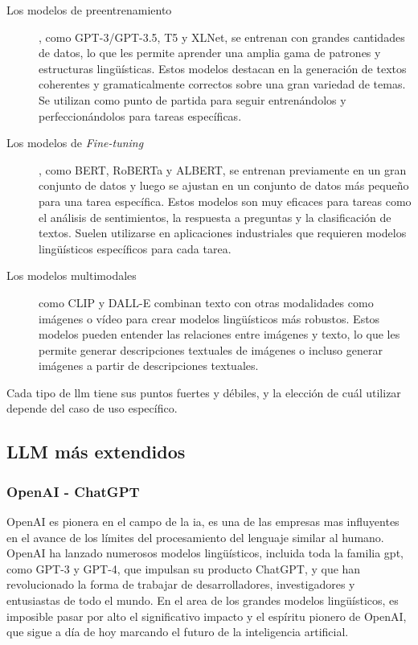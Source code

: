 \begin{description}

\item[Los modelos de preentrenamiento], como GPT-3/GPT-3.5, T5 y XLNet, se entrenan con grandes cantidades de datos, lo que les permite aprender una amplia gama de patrones y estructuras lingüísticas. Estos modelos destacan en la generación de textos coherentes y gramaticalmente correctos sobre una gran variedad de temas. Se utilizan como punto de partida para seguir entrenándolos y perfeccionándolos para tareas específicas.

\item[Los modelos de \textit{Fine-tuning}], como BERT, RoBERTa y ALBERT, se entrenan previamente en un gran conjunto de datos y luego se ajustan en un conjunto de datos más pequeño para una tarea específica. Estos modelos son muy eficaces para tareas como el análisis de sentimientos, la respuesta a preguntas y la clasificación de textos. Suelen utilizarse en aplicaciones industriales que requieren modelos lingüísticos específicos para cada tarea.

\item[Los modelos multimodales] como CLIP y DALL-E combinan texto con otras modalidades como imágenes o vídeo para crear modelos lingüísticos más robustos. Estos modelos pueden entender las relaciones entre imágenes y texto, lo que les permite generar descripciones textuales de imágenes o incluso generar imágenes a partir de descripciones textuales.

\end{description}

Cada tipo de \acrshort{llm} tiene sus puntos fuertes y débiles, y la elección de cuál utilizar depende del caso de uso específico.


\subsection{LLM más extendidos}

\subsubsection{OpenAI - ChatGPT}

OpenAI es pionera en el campo de la \acrlong{ia}, es una de las empresas mas influyentes en el avance de los límites del procesamiento del lenguaje similar al humano. OpenAI ha lanzado numerosos modelos lingüísticos, incluida toda la familia \acrshort{gpt}, como GPT-3 y GPT-4, que impulsan su producto ChatGPT, y que han revolucionado la forma de trabajar de desarrolladores, investigadores y entusiastas de todo el mundo. En el area de los grandes modelos lingüísticos, es imposible pasar por alto el significativo impacto y el espíritu pionero de OpenAI, que sigue a día de hoy marcando el futuro de la inteligencia artificial.

